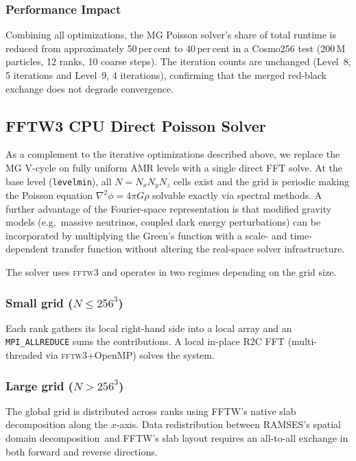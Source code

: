 \documentclass[fleqn,usenatbib]{mnras}
\newcommand{\code}[1]{\texttt{#1}}
\newcommand{\dd}[0]{{domain decomposition}}
\begin{document}
\subsubsection{Performance Impact}
\label{sec:mg_performance}

Combining all optimizations, the MG Poisson solver's share of total
runtime is reduced from approximately 50\,per\,cent to 40\,per\,cent in a
Cosmo256 test ($200\,\mathrm{M}$ particles, 12 ranks, 10 coarse
steps). The iteration counts are unchanged (Level~8, 5 iterations and
Level~9, 4 iterations), confirming that the merged red-black exchange
does not degrade convergence.

\subsection{FFTW3 CPU Direct Poisson Solver}
\label{sec:fftw3}

As a complement to the iterative optimizations described above,
we replace the MG V-cycle
on fully uniform AMR levels with a single direct FFT solve.  At the
base level (\code{levelmin}), all $N = N_x  N_y  N_z$
cells exist and the grid is periodic making the Poisson equation
$\nabla^2\phi = 4\pi G\rho$ solvable exactly via spectral methods.
A further advantage of the Fourier-space representation is that
modified gravity models (e.g.\ massive neutrinos, coupled dark energy
perturbations) can be incorporated by multiplying the Green's function
with a scale- and time-dependent transfer function without altering
the real-space solver infrastructure.

The solver uses \textsc{fftw3} \citep{Frigo2005} and operates in two
regimes depending on the grid size.

\subsubsection{Small grid ($N \le 256^3$)}
Each rank gathers its local right-hand side into a local array and an
\code{MPI\_ALLREDUCE} sums the contributions.  A local in-place R2C
FFT (multi-threaded via \textsc{fftw3}+OpenMP) solves the system.

\subsubsection{Large grid ($N > 256^3$)}
The global grid is distributed across ranks using FFTW's native slab
decomposition along the $x$-axis.  Data redistribution between
RAMSES's spatial \dd\ and FFTW's slab layout requires
an all-to-all exchange in both forward and reverse directions.
\end{document}
